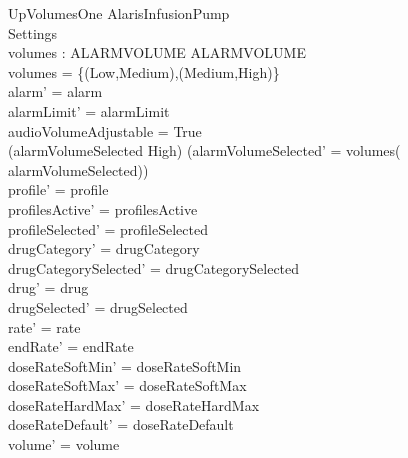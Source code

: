 \begin{schema}{UpVolumesOne}
	\Delta AlarisInfusionPump\\
	 Settings\\
	volumes : ALARMVOLUME \rel ALARMVOLUME\\
	\where
	volumes = \{(Low,Medium),(Medium,High)\}\\
	alarm' = alarm\\
	alarmLimit' = alarmLimit\\
	audioVolumeAdjustable = True\\
	(alarmVolumeSelected \neq High) \land (alarmVolumeSelected' = volumes(\\
	alarmVolumeSelected))\\
	profile' = profile\\
	profilesActive' = profilesActive\\  
	  profileSelected' = profileSelected\\
	drugCategory' = drugCategory\\ drugCategorySelected' = drugCategorySelected\\
	drug' = drug\\ drugSelected' = drugSelected\\
	rate' = rate\\
	\pagebreak 
	endRate' = endRate\\
	doseRateSoftMin' = doseRateSoftMin\\
	doseRateSoftMax' = doseRateSoftMax\\
	doseRateHardMax' = doseRateHardMax\\
	doseRateDefault' = doseRateDefault\\
	volume' = volume\\

\end{schema}
